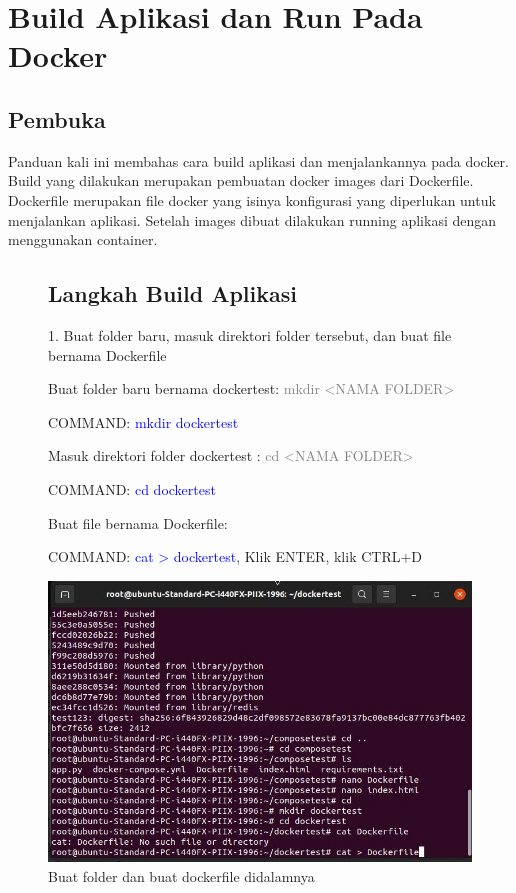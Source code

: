 \chapter{Build Aplikasi dan Run Pada Docker}

\section{Pembuka}
Panduan kali ini membahas cara build aplikasi dan menjalankannya pada docker. Build yang dilakukan merupakan pembuatan docker images dari Dockerfile.
Dockerfile merupakan file docker yang isinya konfigurasi yang diperlukan untuk menjalankan aplikasi. Setelah images dibuat dilakukan running aplikasi 
dengan menggunakan container. 

\begin{figure}
\section{Langkah Build Aplikasi}
1. Buat folder baru, masuk direktori folder tersebut, dan buat file bernama Dockerfile

Buat folder baru bernama dockertest:  \textcolor{Gray}{mkdir <NAMA FOLDER>}

COMMAND: \textcolor{Blue}{mkdir dockertest}

Masuk direktori folder dockertest : \textcolor{Gray}{cd <NAMA FOLDER>}

COMMAND: \textcolor{Blue}{cd dockertest}

Buat file bernama Dockerfile: 

COMMAND: \textcolor{Blue}{cat > dockertest}, Klik ENTER, klik CTRL+D
    \begin{center}
        \includegraphics[width=\linewidth]{image/19.jpg}
        \caption{Buat folder dan buat dockerfile didalamnya}
        \label{fig:my_figure}
    \end{center}
\end{figure}

